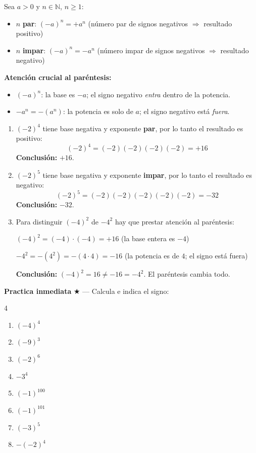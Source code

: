 \documentclass[11pt, letterpaper]{article}
\begin{document}
\begin{tcolorbox}[importantbox, title={Regla del signo para base negativa}]
Sea $a > 0$ y $n \in \mathbb{N}$, $n \geq 1$:
\begin{itemize}[itemsep=4pt]
  \item $n$ \textbf{par}: $(-a)^n = +a^n$ \quad (número par de signos negativos $\Rightarrow$ resultado positivo)
  \item $n$ \textbf{impar}: $(-a)^n = -a^n$ \quad (número impar de signos negativos $\Rightarrow$ resultado negativo)
\end{itemize}

\textbf{Atención crucial al paréntesis:}
\begin{itemize}[itemsep=3pt]
  \item $(-a)^n$: la base es $-a$; el signo negativo \emph{entra} dentro de la potencia.
  \item $-a^n = -(a^n)$: la potencia es solo de $a$; el signo negativo está \emph{fuera}.
\end{itemize}
\end{tcolorbox}

\begin{tcolorbox}[examplebox, title={Ejemplos — regla del signo}]
\begin{enumerate}[label=\textbf{Ej. \arabic*.}, leftmargin=*, itemsep=14pt]

\item $(-2)^4$ tiene base negativa y exponente \textbf{par}, por lo tanto el resultado es positivo:
$$(-2)^4 = (-2)(-2)(-2)(-2) = +16$$
\textbf{Conclusión:} $+16$.

\item $(-2)^5$ tiene base negativa y exponente \textbf{impar}, por lo tanto el resultado es negativo:
$$(-2)^5 = (-2)(-2)(-2)(-2)(-2) = -32$$
\textbf{Conclusión:} $-32$.

\item Para distinguir $(-4)^2$ de $-4^2$ hay que prestar atención al paréntesis:

$(-4)^2 = (-4)\cdot(-4) = +16$ \quad (la base entera es $-4$)

$-4^2 = -(4^2) = -(4\cdot 4) = -16$ \quad (la potencia es de $4$; el signo está fuera)

\textbf{Conclusión:} $(-4)^2 = 16 \neq -16 = -4^2$. El paréntesis cambia todo.
\end{enumerate}
\end{tcolorbox}

\medskip
\textbf{Practica inmediata} \quad $\bigstar$ — Calcula e indica el signo:
\begin{multicols}{4}
\begin{enumerate}[label=\alph*), leftmargin=*]
  \item $(-4)^4$
  \item $(-9)^3$
  \item $(-2)^6$
  \item $-3^4$
  \item $(-1)^{100}$
  \item $(-1)^{101}$
  \item $(-3)^5$
  \item $-(-2)^4$
\end{enumerate}
\end{multicols}
\end{document}
